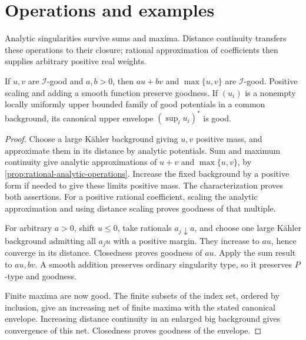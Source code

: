 \section{Operations and examples}
\label{sec:i-good-operations}
Analytic singularities survive sums and maxima. Distance continuity transfers these operations to their closure; rational approximation of coefficients then supplies arbitrary positive real weights.

\begin{proposition}\label{prop:i-good-positive-algebra-and-suprema}
If $u,v$ are $\mathcal I$-good and $a,b>0$, then $au+bv$ and $\max\{u,v\}$ are $\mathcal I$-good. Positive scaling and adding a smooth function preserve goodness. If $(u_i)$ is a nonempty locally uniformly upper bounded family of good potentials in a common background, its canonical upper envelope $(\sup_i u_i)^*$ is good.
\end{proposition}
\begin{proof}
Choose a large K\"ahler background giving $u,v$ positive mass, and approximate them in its distance by analytic potentials. Sum and maximum continuity give analytic approximations of $u+v$ and $\max\{u,v\}$, by \cref{prop:rational-analytic-operations}. Increase the fixed background by a positive form if needed to give these limits positive mass. The characterization proves both assertions. For a positive rational coefficient, scaling the analytic approximation and using distance scaling proves goodness of that multiple.

For arbitrary $a>0$, shift $u\leq0$, take rationals $a_j\downarrow a$, and choose one large K\"ahler background admitting all $a_ju$ with a positive margin. They increase to $au$, hence converge in its distance. Closedness proves goodness of $au$. Apply the sum result to $au,bv$. A smooth addition preserves ordinary singularity type, so it preserves $P$-type and goodness.

Finite maxima are now good. The finite subsets of the index set, ordered by inclusion, give an increasing net of finite maxima with the stated canonical envelope. Increasing distance continuity in an enlarged big background gives convergence of this net. Closedness proves goodness of the envelope.
\end{proof}

